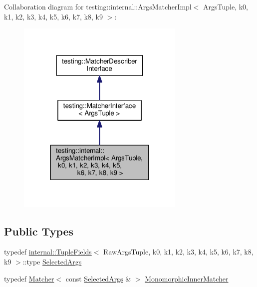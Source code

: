 Collaboration diagram for testing\+:\+:internal\+:\+:Args\+Matcher\+Impl$<$ Args\+Tuple, k0, k1, k2, k3, k4, k5, k6, k7, k8, k9 $>$\+:\nopagebreak
\begin{figure}[H]
\begin{center}
\leavevmode
\includegraphics[width=227pt]{classtesting_1_1internal_1_1ArgsMatcherImpl__coll__graph}
\end{center}
\end{figure}
\subsection*{Public Types}
\begin{DoxyCompactItemize}
\item 
typedef \hyperlink{classtesting_1_1internal_1_1TupleFields}{internal\+::\+Tuple\+Fields}$<$ Raw\+Args\+Tuple, k0, k1, k2, k3, k4, k5, k6, k7, k8, k9 $>$\+::type \hyperlink{classtesting_1_1internal_1_1ArgsMatcherImpl_ab061679f6251e56ccbedaf0c316d00ff}{Selected\+Args}
\item 
typedef \hyperlink{classtesting_1_1Matcher}{Matcher}$<$ const \hyperlink{classtesting_1_1internal_1_1ArgsMatcherImpl_ab061679f6251e56ccbedaf0c316d00ff}{Selected\+Args} \& $>$ \hyperlink{classtesting_1_1internal_1_1ArgsMatcherImpl_ab90d2c074b2072d6c39bf26209fb941f}{Monomorphic\+Inner\+Matcher}
\end{DoxyCompactItemize}
